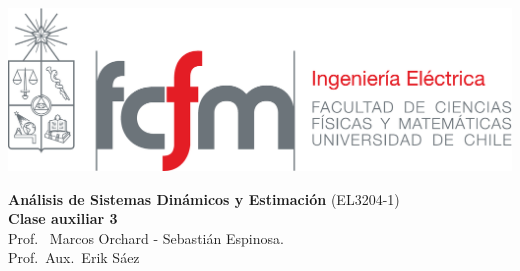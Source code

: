 \documentclass[
  11pt,
  letterpaper,
   addpoints,
   answers
  ]{exam}
\begin{document}
\noindent
\begin{minipage}{0.47\textwidth}
\includegraphics[width=\textwidth]{../fcfm_die}
\end{minipage}
\begin{minipage}{0.53\textwidth}
\begin{center}
\large\textbf{Análisis de Sistemas Dinámicos y Estimación} (EL3204-1) \\
\large\textbf{Clase auxiliar 3} \\
\normalsize Prof.~ Marcos Orchard - Sebastián Espinosa.\\
\normalsize Prof.~Aux.~Erik Sáez
\end{center}
\end{minipage}

\vspace{0.5cm}
\noindent
\vspace{.85cm}
\end{document}
